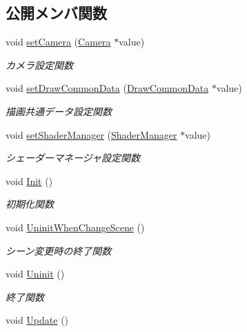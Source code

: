 \subsection*{公開メンバ関数}
\begin{DoxyCompactItemize}
\item 
void \mbox{\hyperlink{class_render_target_main_ae37304ee8e63056e4a1d1b956bcd47b4}{set\+Camera}} (\mbox{\hyperlink{class_camera}{Camera}} $\ast$value)
\begin{DoxyCompactList}\small\item\em カメラ設定関数 \end{DoxyCompactList}\item 
void \mbox{\hyperlink{class_render_target_main_a374684a81401904fbc94c748312d278b}{set\+Draw\+Common\+Data}} (\mbox{\hyperlink{class_draw_common_data}{Draw\+Common\+Data}} $\ast$value)
\begin{DoxyCompactList}\small\item\em 描画共通データ設定関数 \end{DoxyCompactList}\item 
void \mbox{\hyperlink{class_render_target_main_ae41a70c604737348419502b56720c84b}{set\+Shader\+Manager}} (\mbox{\hyperlink{class_shader_manager}{Shader\+Manager}} $\ast$value)
\begin{DoxyCompactList}\small\item\em シェーダーマネージャ設定関数 \end{DoxyCompactList}\item 
void \mbox{\hyperlink{class_render_target_main_a323281d847f7ecee50a5ac551fa163d9}{Init}} ()
\begin{DoxyCompactList}\small\item\em 初期化関数 \end{DoxyCompactList}\item 
void \mbox{\hyperlink{class_render_target_main_aefaa81a0ccf53f1162d230b3b781d892}{Uninit\+When\+Change\+Scene}} ()
\begin{DoxyCompactList}\small\item\em シーン変更時の終了関数 \end{DoxyCompactList}\item 
void \mbox{\hyperlink{class_render_target_main_a9b9b05720ddd8918c3c605250e5dd81b}{Uninit}} ()
\begin{DoxyCompactList}\small\item\em 終了関数 \end{DoxyCompactList}\item 
void \mbox{\hyperlink{class_render_target_main_a5c25049decc949b019147c4c94828517}{Update}} ()

\end{DoxyCompactItemize}
